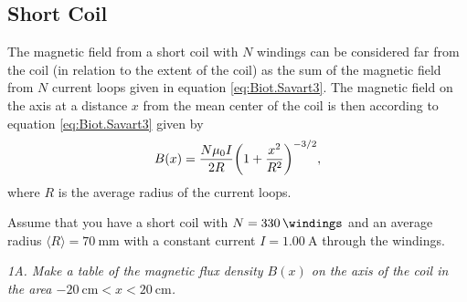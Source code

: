 \documentclass[../Elmag-labhefte-2020.tex]{subfiles}
\begin{document}
\subsection{Short Coil}

The magnetic field from a short coil with $N$ windings can be considered far from the coil (in relation to the extent of the coil) as the sum of the magnetic field from $N$ current loops given in equation \eqref{eq:Biot.Savart3}. The magnetic field on the axis at a distance $x$ from the mean center
of the coil is then according to equation \eqref{eq:Biot.Savart3} given by
%
\begin{equation}
    B(x) = \frac{N\mu_0 I}{2 R} \qty(1 + \frac{x^{2}}{R^{2}})^{-3/2},
    \label{eq:kort.spole}
\end{equation}
%
where $R$ is the average radius of the current loops.

Assume that you have a short coil with $N = \SI{330}{\windings}$ and an average radius $\langle R \rangle  = \SI{70}{\mm}$ with a constant current $I = \SI{1.00}{\ampere}$ through the windings.

\emph{ 1A. Make a table of the magnetic flux density $B(x)$ on the axis of the coil in the area $-\SI{20}{\cm} < x < \SI{20}{\cm}$.}
\end{document}
